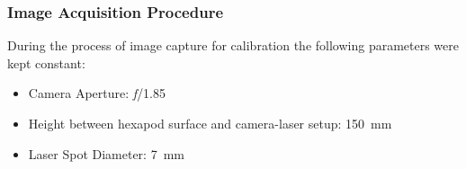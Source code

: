 
            

    \subsubsection*{Image Acquisition Procedure}\label{subsection:image_acq_calib}
        During the process of image capture for calibration the following parameters were kept constant:
        \begin{itemize}
            \item Camera Aperture: \emph{f}/1.85
            \item Height between hexapod surface and camera-laser setup: \SI{150}{\milli\meter}
            \item Laser Spot Diameter: \SI{7}{\milli\meter}
        \end{itemize}
        
